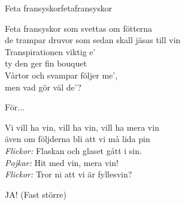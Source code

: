 \begin{song}{Feta fransyskor}{fetafransyskor}
\begin{vers}
Feta fransyskor som svettas om fötterna\\
de trampar druvor som sedan skall jäsas till vin\\
Transpirationen viktig e'\\
ty den ger fin bouquet\\
Vårtor och svampar följer me',\\
men vad gör väl de'?\\
\end{vers}
\begin{vers}
För...\\
\end{vers}
\begin{vers}
Vi vill ha vin, vill ha vin, vill ha mera vin\\
även om följderna bli att vi må lida pin\\
\textit{Flickor:}   Flaskan och glaset gått i sin.\\
\textit{Pojkar:}    Hit med vin, mera vin!\\
\textit{Flickor:}   Tror ni att vi är fyllesvin?\\
\end{vers}
\begin{vers}
JA! (Fast större)\\
\end{vers}
\end{song}
